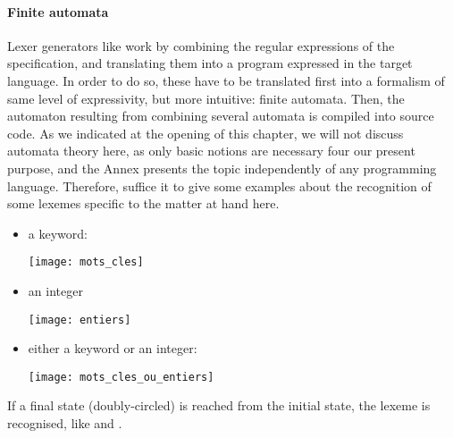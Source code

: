 \documentclass[12pt,a4paper]{article}
\begin{document}
\paragraph{Finite automata}

Lexer generators like \ocamllex work by combining the regular
expressions of the specification, and translating them into a program
expressed in the target language. In order to do so, these have to be
translated first into a formalism of same level of expressivity, but
more intuitive: finite automata. Then, the automaton resulting from
combining several automata is compiled into source code. As we
indicated at the opening of this chapter, we will not discuss automata
theory here, as only basic notions are necessary four our present
purpose, and the Annex presents the topic independently of any
programming language. Therefore, suffice it to give some examples
about the recognition of some lexemes specific to the matter at hand
here.
\begin{itemize}

   \item a keyword:
     \begin{center}
       \texttt{[image: mots\_cles]}
     \end{center}

  \item an integer
    \begin{center}
      \texttt{[image: entiers]}
    \end{center}

  \item either a keyword or an integer:
    \begin{center}
      \texttt{[image: mots\_cles\_ou\_entiers]}
    \end{center}

\end{itemize}
If a final state (doubly\hyp{}circled) is reached from the initial
state, the lexeme is recognised, like \Tlet and \Tint.
\end{document}
